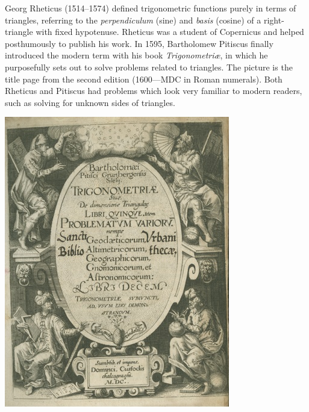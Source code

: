 \begin{minipage}[t]{0.67\linewidth}\vspace{0pt}
	
	Georg Rheticus (1514--1574) defined trigonometric functions purely in terms of triangles, referring to the \emph{perpendiculum} (sine) and \emph{basis} (cosine) of a right-triangle with fixed hypotenuse. Rheticus was a student of Copernicus and helped posthumously to publish his work.\smallbreak
	In 1595, Bartholomew Pitiscus finally introduced the modern term with his book \emph{Trigonometriæ}, in which he purposefully sets out to solve problems related to triangles. The picture is the title page from the second edition (1600---MDC in Roman numerals). Both Rheticus and Pitiscus had problems which look very familiar to modern readers, such as solving for unknown sides of triangles.
\end{minipage}
\hfill
\begin{minipage}[t]{0.32\linewidth}\vspace{-3pt}
	\flushright\includegraphics[scale=0.38]{trigonometria}
\end{minipage}\par
\goodbreak



